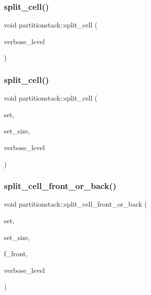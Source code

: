 \subsubsection{\texorpdfstring{split\+\_\+cell()}{split\_cell()}\hspace{0.1cm}{\footnotesize\ttfamily [1/2]}}
{\footnotesize\ttfamily void partitionstack\+::split\+\_\+cell (\begin{DoxyParamCaption}\item[{\mbox{\hyperlink{galois_8h_a09fddde158a3a20bd2dcadb609de11dc}{I\+NT}}}]{verbose\+\_\+level }\end{DoxyParamCaption})}

\mbox{\label{classpartitionstack_a1b761500b635cd05ca1c02666e288315}} 
\subsubsection{\texorpdfstring{split\+\_\+cell()}{split\_cell()}\hspace{0.1cm}{\footnotesize\ttfamily [2/2]}}
{\footnotesize\ttfamily void partitionstack\+::split\+\_\+cell (\begin{DoxyParamCaption}\item[{\mbox{\hyperlink{galois_8h_a09fddde158a3a20bd2dcadb609de11dc}{I\+NT}} $\ast$}]{set,  }\item[{\mbox{\hyperlink{galois_8h_a09fddde158a3a20bd2dcadb609de11dc}{I\+NT}}}]{set\+\_\+size,  }\item[{\mbox{\hyperlink{galois_8h_a09fddde158a3a20bd2dcadb609de11dc}{I\+NT}}}]{verbose\+\_\+level }\end{DoxyParamCaption})}

\mbox{\label{classpartitionstack_a7f8fd8ee23538d664e0ce22b10b41d33}} 
\subsubsection{\texorpdfstring{split\+\_\+cell\+\_\+front\+\_\+or\+\_\+back()}{split\_cell\_front\_or\_back()}}
{\footnotesize\ttfamily void partitionstack\+::split\+\_\+cell\+\_\+front\+\_\+or\+\_\+back (\begin{DoxyParamCaption}\item[{\mbox{\hyperlink{galois_8h_a09fddde158a3a20bd2dcadb609de11dc}{I\+NT}} $\ast$}]{set,  }\item[{\mbox{\hyperlink{galois_8h_a09fddde158a3a20bd2dcadb609de11dc}{I\+NT}}}]{set\+\_\+size,  }\item[{\mbox{\hyperlink{galois_8h_a09fddde158a3a20bd2dcadb609de11dc}{I\+NT}}}]{f\+\_\+front,  }\item[{\mbox{\hyperlink{galois_8h_a09fddde158a3a20bd2dcadb609de11dc}{I\+NT}}}]{verbose\+\_\+level }\end{DoxyParamCaption})}

